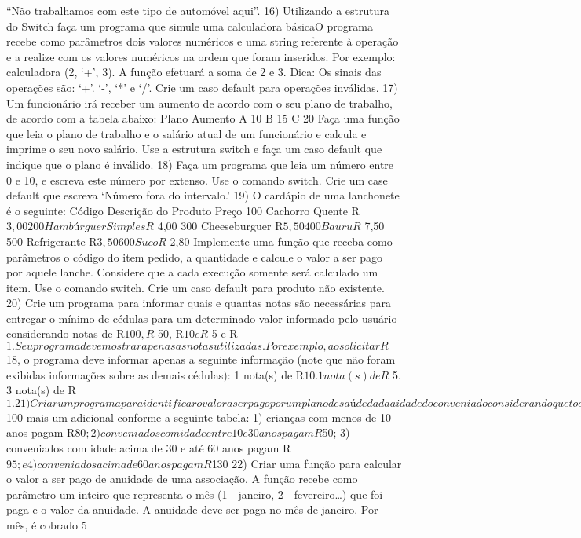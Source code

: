 “Não trabalhamos com este tipo de automóvel aqui”.
16) Utilizando a estrutura do Switch faça um programa que simule uma calculadora básicaO programa recebe
como parâmetros dois valores numéricos e uma string referente à operação e a realize com os valores
numéricos na ordem que foram inseridos. Por exemplo: calculadora (2, ‘+’, 3). A função efetuará a soma de 2 e
3. Dica: Os sinais das operações são: ‘+’. ‘-’, ‘*’ e ‘/’. Crie um caso default para operações inválidas.
17) Um funcionário irá receber um aumento de acordo com o seu plano de
trabalho, de acordo com a tabela abaixo:
Plano Aumento
A 10%
B 15%
C 20%
Faça uma função que leia o plano de trabalho e o salário atual de um funcionário e calcula e imprime o seu
novo salário. Use a estrutura switch e faça um caso default que indique que o plano é inválido.
18) Faça um programa que leia um número entre 0 e 10, e escreva este número por extenso. Use o comando
switch. Crie um case default que escreva ‘Número fora do intervalo.’
19) O cardápio de uma lanchonete é o seguinte:
Código Descrição do Produto Preço
100 Cachorro Quente R$ 3,00
200 Hambúrguer Simples R$ 4,00
300 Cheeseburguer R$ 5,50
400 Bauru R$ 7,50
500 Refrigerante R$ 3,50
600 Suco R$ 2,80
Implemente uma função que receba como parâmetros o código do item pedido, a quantidade e calcule o valor
a ser pago por aquele lanche. Considere que a cada execução somente será calculado um item. Use o
comando switch. Crie um caso default para produto não existente.
20) Crie um programa para informar quais e quantas notas são necessárias para entregar o mínimo de cédulas
para um determinado valor informado pelo usuário considerando notas de R$ 100, R$ 50, R$ 10 e R$ 5 e R$ 1.
Seu programa deve mostrar apenas as notas utilizadas. Por exemplo, ao solicitar R$18, o programa deve
informar apenas a seguinte informação (note que não foram exibidas informações sobre as demais cédulas): 1
nota(s) de R$ 10. 1 nota(s) de R$ 5. 3 nota(s) de R$ 1.
21) Criar um programa para identificar o valor a ser pago por um plano de saúde dada a idade do conveniado
considerando que todos pagam R$ 100 mais um adicional conforme a seguinte tabela: 1) crianças com menos
de 10 anos pagam R$80; 2) conveniados com idade entre 10 e 30 anos pagam R$50; 3) conveniados com
idade acima de 30 e até 60 anos pagam R$ 95; e 4) conveniados acima de 60 anos pagam R$130
22) Criar uma função para calcular o valor a ser pago de anuidade de uma associação. A função recebe como
parâmetro um inteiro que representa o mês (1 - janeiro, 2 - fevereiro…) que foi paga e o valor da anuidade. A
anuidade deve ser paga no mês de janeiro. Por mês, é cobrado 5%
